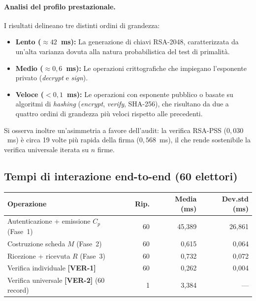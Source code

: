 \paragraph{Analisi del profilo prestazionale.} I risultati delineano tre distinti ordini di grandezza:
\begin{itemize}
  \item \textbf{Lento ($\approx 42$~ms):} La generazione di chiavi RSA-2048, caratterizzata da un'alta varianza dovuta alla natura probabilistica del test di primalità.
  \item \textbf{Medio ($\approx 0{,}6$~ms):} Le operazioni crittografiche che impiegano l'esponente privato (\emph{decrypt} e \emph{sign}).
  \item \textbf{Veloce ($< 0{,}1$~ms):} Le operazioni con esponente pubblico o basate su algoritmi di \emph{hashing} (\emph{encrypt}, \emph{verify}, SHA-256), che risultano da due a quattro ordini di grandezza più veloci rispetto alle precedenti.
\end{itemize}

Si osserva inoltre un'asimmetria a favore dell'audit: la verifica RSA-PSS ($0{,}030$~ms) è circa 19 volte più rapida della firma ($0{,}568$~ms), il che rende sostenibile la verifica universale iterata su $n$ firme.

\subsection{Tempi di interazione end-to-end (60 elettori)}
\label{subsec:wp4_e2e}

\begin{center}
\small
\begin{tabular}{|l|r|r|r|}
\hline
\textbf{Operazione} & \textbf{Rip.} & \textbf{Media (ms)} & \textbf{Dev.std (ms)} \\
\hline
Autenticazione + emissione $C_p$ (Fase~1) & 60 & 45,389 & 26,861 \\
Costruzione scheda $M$ (Fase~2)            & 60 & 0,615  & 0,064  \\
Ricezione + ricevuta $R$ (Fase~3)          & 60 & 0,732  & 0,072  \\
Verifica individuale \textbf{[VER-1]}      & 60 & 0,262  & 0,004  \\
Verifica universale \textbf{[VER-2]} (60 record) & 1 & 3,384 & — \\
\hline
\end{tabular}
\end{center}

